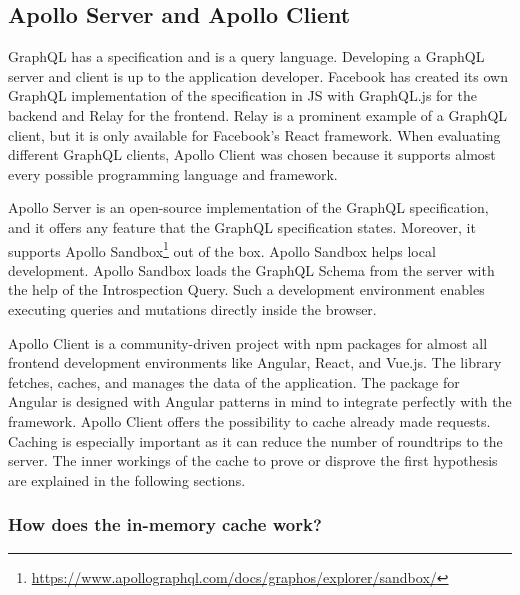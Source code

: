 \subsection{Apollo Server and Apollo Client}\label{subsection:background:graphql:apollo-server-client}

GraphQL has a specification and is a query language. Developing a GraphQL server and client is up to the application developer. Facebook has created its own GraphQL implementation of the specification in \ac{JS} with GraphQL.js for the backend and Relay for the frontend. Relay is a prominent example of a GraphQL client, but it is only available for Facebook's React framework. When evaluating different GraphQL clients, Apollo Client was chosen because it supports almost every possible programming language and framework.

\bigskip

\noindent Apollo Server is an open-source implementation of the GraphQL specification, and it offers any feature that the GraphQL specification states. Moreover, it supports Apollo Sandbox\footnote{\url{https://www.apollographql.com/docs/graphos/explorer/sandbox/}} out of the box. \cite{misc:-:background:graphql:apollo-server-introduction} Apollo Sandbox helps local development. Apollo Sandbox loads the GraphQL Schema from the server with the help of the Introspection Query. \cite{misc:-:background:graphql:apollo-sandbox} Such a development environment enables executing queries and mutations directly inside the browser.

\bigskip

\noindent Apollo Client is a community-driven project with npm packages for almost all frontend development environments like Angular, React, and Vue.js. The library fetches, caches, and manages the data of the application. The package for Angular is designed with Angular patterns in mind to integrate perfectly with the framework. Apollo Client offers the possibility to cache already made requests. \cite{misc:-:background:graphql:apollo-angular-client-overview} \cite{misc:-:background:graphql:apollo-client-overview} Caching is especially important as it can reduce the number of roundtrips to the server. The inner workings of the cache to prove or disprove the first hypothesis are explained in the following sections.

\subsubsection{How does the in-memory cache work?}\label{subsubsection:background:graphql:apollo-server-client:in-memory-cache-working}

